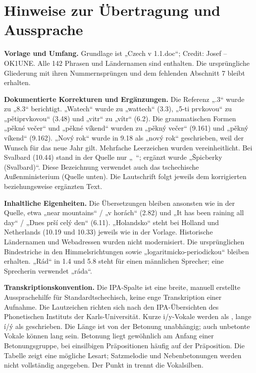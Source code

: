 \documentclass[a4paper,landscape,10pt]{article}
\newcommand{\ipa}[1]{{\ipafont[#1]}}
\begin{document}
\section*{Hinweise zur Übertragung und Aussprache}
\fontsize{8.5}{10.5}\selectfont\raggedright
\textbf{Vorlage und Umfang.} Grundlage ist „Czech v 1.1.doc“; Credit: Josef -- OK1UNE.
Alle 142 Phrasen und Ländernamen sind enthalten. Die ursprüngliche Gliederung mit ihren Nummernsprüngen
und dem fehlenden Abschnitt 7 bleibt erhalten.

\smallskip
\textbf{Dokumentierte Korrekturen und Ergänzungen.} Die Referenz „.3“ wurde zu „8.3“ berichtigt.
„Watech“ wurde zu „wattech“ (3.3), „5-ti prvkovou“ zu „pětiprvkovou“ (3.48) und „vitr“ zu „vítr“ (6.2).
Die grammatischen Formen „pěkné večer“ und „pěkné víkend“ wurden zu „pěkný večer“ (9.161) und
„pěkný víkend“ (9.162). „Nový rok“ wurde in 9.18 als „nový rok“ geschrieben, weil der Wunsch
für das neue Jahr gilt. Mehrfache Leerzeichen wurden vereinheitlicht. Bei Svalbard (10.44) stand in der
Quelle nur „~“; ergänzt wurde „Špicberky (Svalbard)“. Diese Bezeichnung verwendet auch das tschechische
Außenministerium (Quelle unten). Die Lautschrift folgt jeweils dem korrigierten beziehungsweise ergänzten Text.

\smallskip
\textbf{Inhaltliche Eigenheiten.} Die Übersetzungen bleiben ansonsten wie in der Quelle, etwa
„near mountains“ / „v horách“ (2.82) und „It has been raining all day“ / „Dnes prší celý den“ (6.11).
„Holandsko“ steht bei Holland und Netherlands (10.19 und 10.33) jeweils wie in der Vorlage.
Historische Ländernamen und Webadressen wurden nicht modernisiert. Die ursprünglichen Bindestriche
in den Himmelsrichtungen sowie „logaritmicko-periodickou“ bleiben erhalten. „Rád“ in 1.4 und 5.8
steht für einen männlichen Sprecher; eine Sprecherin verwendet „ráda“.

\smallskip
\textbf{Transkriptionskonvention.} Die IPA-Spalte ist eine breite, manuell erstellte Aussprachehilfe
für Standardtschechisch, keine enge Transkription einer Aufnahme. Die Lautzeichen richten sich nach
den IPA-Übersichten des Phonetischen Instituts der Karls-Universität. Kurze i/y-Vokale werden als \ipa{ɪ},
lange í/ý als \ipa{iː} geschrieben. Die Länge ist von der Betonung unabhängig; auch unbetonte Vokale
können lang sein. Betonung liegt gewöhnlich am Anfang einer Betonungsgruppe, bei einsilbigen Präpositionen
häufig auf der Präposition. Die Tabelle zeigt eine mögliche Lesart; Satzmelodie und Nebenbetonungen
werden nicht vollständig angegeben. Der Punkt in \ipa{ˈpo.uʒiːvaːm} trennt die Vokalsilben.
\end{document}
